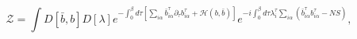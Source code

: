 \documentclass{article}
\begin{document}
\title{}

\author{}

\date{\today}

\maketitle




\begin{equation}
\mathcal{Z}=\int D[\bar{b},b]D[\lambda]e^{-\int_{0}^{\beta}d\tau[\sum_{i\alpha}\bar{b}_{i\alpha}^{\tau}\partial_{\tau}b_{i\alpha}^{\tau}+\mathcal{H}(b,\bar{b})]}e^{-i\int_{0}^{\beta}d\tau\lambda_{i}^{\tau}\sum_{i\alpha}(\bar{b}_{i\alpha}^{\tau}b_{i\alpha}^{\tau}-NS)},
\end{equation}
\end{document}
